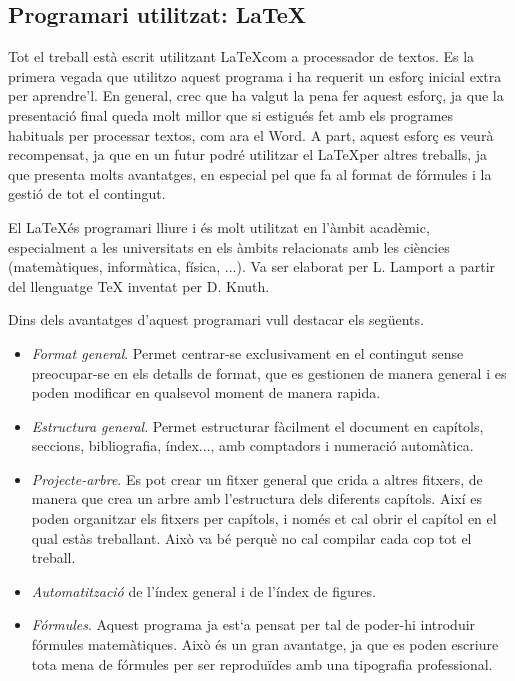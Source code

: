 \begin{refsection}
\chapter{Programari utilitzat: \LaTeX}

Tot el treball està escrit utilitzant \LaTeX com a processador de textos. Es la primera vegada que utilitzo aquest programa i ha requerit un esforç inicial extra per aprendre'l. En general, crec que ha valgut la pena fer aquest esforç, ja que la presentació final queda molt millor que si estigués fet amb els programes habituals per processar textos, com ara el Word. A part, aquest esforç es veurà recompensat, ja que en un futur podré utilitzar el \LaTeX per altres treballs, ja que presenta molts avantatges, en especial pel que fa al format de fórmules i la gestió de tot el contingut.

El \LaTeX és programari lliure i és molt utilitzat en l'àmbit acadèmic, especialment a les universitats en els àmbits relacionats amb les ciències (matemàtiques, informàtica, física, ...). Va ser elaborat per L. Lamport a partir del llenguatge TeX inventat per D. Knuth.\supercite{LaTeX}

Dins dels avantatges d’aquest programari vull destacar els següents.

\begin{itemize}
	\item \textit{Format general}. Permet centrar-se exclusivament en el contingut sense preocupar-se en els detalls de format, que es gestionen de manera general i es poden modificar en qualsevol moment de manera rapida.
	
	\item \textit{Estructura general}. Permet estructurar fàcilment el document en capítols, seccions, bibliografia, índex..., amb comptadors i numeració automàtica.
	
	\item \textit{Projecte-arbre}. Es pot crear un fitxer general que crida a altres fitxers, de manera que crea un arbre amb l’estructura dels diferents capítols. Així es poden organitzar els fitxers per capítols, i només et cal obrir el capítol en el qual estàs treballant. Això va bé perquè no cal compilar cada cop tot el treball.
	
	\item \textit{Automatització} de l'índex general i de l'índex de figures.
	
	\item \textit{Fórmules}. Aquest programa ja est`a pensat per tal de poder-hi introduir fórmules matemàtiques. Això és un gran avantatge, ja que es poden escriure tota mena de
	fórmules per ser reproduïdes amb una tipografia professional.
	

\end{itemize}
\end{refsection}
